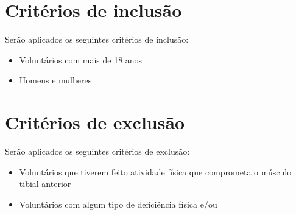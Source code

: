 \section{Critérios de inclusão}

Serão aplicados os seguintes critérios de inclusão:

\begin{itemize}
  \item Voluntários com mais de 18 anos
  \item Homens e mulheres  
\end{itemize}

\section{Critérios de exclusão}

Serão aplicados os seguintes critérios de exclusão:

\begin{itemize}
  \item Voluntários que tiverem feito atividade física que comprometa o músculo tibial anterior
  \item Voluntários com algum tipo de deficiência física e/ou 
\end{itemize}